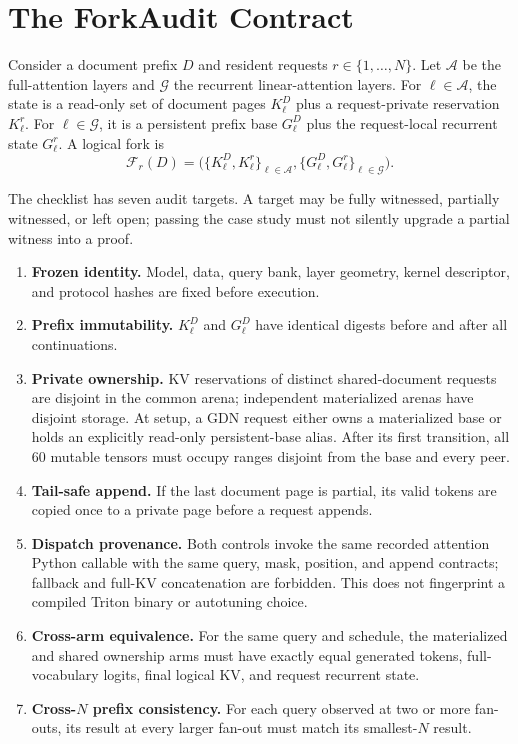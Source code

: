 \documentclass{article}
\begin{document}
\section{The ForkAudit Contract}
\label{sec:contract}

Consider a document prefix $D$ and resident requests
$r\in\{1,\ldots,N\}$.  Let $\mathcal{A}$ be the full-attention layers and
$\mathcal{G}$ the recurrent linear-attention layers.  For
$\ell\in\mathcal{A}$, the state is a read-only set of document pages
$K^D_\ell$ plus a request-private reservation $K^r_\ell$.  For
$\ell\in\mathcal{G}$, it is a persistent prefix base $G^D_\ell$ plus the
request-local recurrent state $G^r_\ell$.  A logical fork is
\begin{equation}
  \mathcal{F}_r(D) =
  \bigl(\{K^D_\ell,K^r_\ell\}_{\ell\in\mathcal{A}},
        \{G^D_\ell,G^r_\ell\}_{\ell\in\mathcal{G}}\bigr).
\end{equation}

The checklist has seven audit targets.  A target may be fully witnessed,
partially witnessed, or left open; passing the case study must not silently
upgrade a partial witness into a proof.
\FloatBarrier
\begin{enumerate}
  \item \textbf{Frozen identity.}  Model, data, query bank, layer geometry,
  kernel descriptor, and protocol hashes are fixed before execution.
  \item \textbf{Prefix immutability.}  $K^D_\ell$ and $G^D_\ell$ have identical
  digests before and after all continuations.
  \item \textbf{Private ownership.}  KV reservations of distinct
  shared-document requests are disjoint in the common arena; independent
  materialized arenas have disjoint storage.  At setup, a GDN request either
  owns a materialized base or holds an explicitly read-only persistent-base
  alias.  After its first transition, all 60 mutable tensors must occupy ranges
  disjoint from the base and every peer.
  \item \textbf{Tail-safe append.}  If the last document page is partial, its
  valid tokens are copied once to a private page before a request appends.
  \item \textbf{Dispatch provenance.}  Both controls invoke the same recorded
  attention Python callable with the same query, mask, position, and append
  contracts; fallback and full-KV concatenation are forbidden.  This does not
  fingerprint a compiled Triton binary or autotuning choice.
  \item \textbf{Cross-arm equivalence.}  For the same query and schedule, the
  materialized and shared ownership arms must have exactly equal generated
  tokens, full-vocabulary logits, final logical KV, and request recurrent
  state.
  \item \textbf{Cross-$N$ prefix consistency.}  For each query observed at two or more
  fan-outs, its result at every larger fan-out must match its smallest-$N$
  result.
\end{enumerate}
\end{document}
